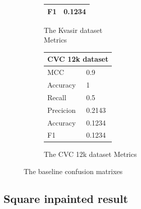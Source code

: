 \begin{figure}[h]
\begin{subfigure}[b]{0.49\textwidth}
\begin{tabular}{ll}
        F1                                     & 0.1234\\
        \bottomrule
\end{tabular}
\caption{The Kvasir dataset\\ Metrics}
\label{tab:kvasir_metrics_base}
\end{subfigure}%
\begin{subfigure}[b]{0.25\textwidth}
        \begin{tabular}{ll}
        \toprule
        \multicolumn{2}{c}{CVC 12k dataset}        \\
        \midrule
        MCC & 0.9    \\
        Accuracy                         & 1      \\
        Recall                              & 0.5    \\
        Precicion                        & 0.2143 \\
        Accuracy                        & 0.1234 \\
        F1                                     & 0.1234\\
        \bottomrule
        \end{tabular}
\caption{The CVC 12k dataset Metrics}
\label{tab:cvc12k_metrics_base}
\end{subfigure}
\caption{The baseline confusion matrixes}
\label{fig:BaselineCM}
\end{figure}
\FloatBarrier




\subsection{Square inpainted result}



